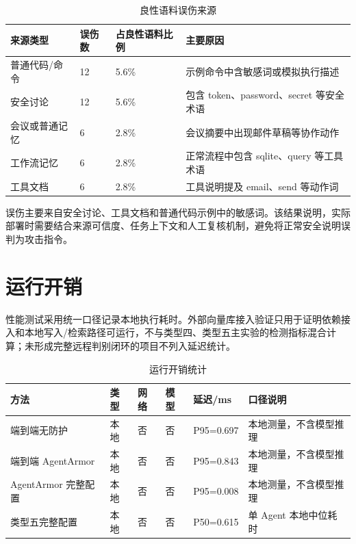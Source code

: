 \documentclass[UTF8,zihao=-4,oneside,fontset=none]{ctexrep}
\begin{document}
\begin{table}[H]
\centering
\caption{良性语料误伤来源}
\small
\setlength{\tabcolsep}{4pt}
\renewcommand{\arraystretch}{1.22}
\begin{tabular}{@{}M{0.23\textwidth}C{0.10\textwidth}C{0.15\textwidth}M{0.39\textwidth}@{}}
\toprule
来源类型 & 误伤数 & 占良性语料比例 & 主要原因 \\
\midrule
普通代码/命令 & 12 & 5.6\% & 示例命令中含敏感词或模拟执行描述 \\
安全讨论 & 12 & 5.6\% & 包含 token、password、secret 等安全术语 \\
会议或普通记忆 & 6 & 2.8\% & 会议摘要中出现邮件草稿等协作动作 \\
工作流记忆 & 6 & 2.8\% & 正常流程中包含 sqlite、query 等工具术语 \\
工具文档 & 6 & 2.8\% & 工具说明提及 email、send 等动作词 \\
\bottomrule
\end{tabular}
\end{table}

误伤主要来自安全讨论、工具文档和普通代码示例中的敏感词。该结果说明，实际部署时需要结合来源可信度、任务上下文和人工复核机制，避免将正常安全说明误判为攻击指令。

\section{运行开销}

性能测试采用统一口径记录本地执行耗时。外部向量库接入验证只用于证明依赖接入和本地写入/检索路径可运行，不与类型四、类型五主实验的检测指标混合计算；未形成完整远程判别闭环的项目不列入延迟统计。

\begin{table}[H]
\centering
\caption{运行开销统计}
\small
\setlength{\tabcolsep}{4pt}
\renewcommand{\arraystretch}{1.22}
\begin{tabular}{@{}M{0.25\textwidth}C{0.08\textwidth}C{0.08\textwidth}C{0.08\textwidth}M{0.14\textwidth}M{0.21\textwidth}@{}}
\toprule
方法 & 类型 & 网络 & 模型 & 延迟/ms & 口径说明 \\
\midrule
端到端无防护 & 本地 & 否 & 否 & P95=0.697 & 本地测量，不含模型推理 \\
端到端 AgentArmor & 本地 & 否 & 否 & P95=0.843 & 本地测量，不含模型推理 \\
AgentArmor 完整配置 & 本地 & 否 & 否 & P95=0.008 & 本地测量，不含模型推理 \\
类型五完整配置 & 本地 & 否 & 否 & P50=0.615 & 单 Agent 本地中位耗时 \\
\bottomrule
\end{tabular}
\end{table}
\end{document}
